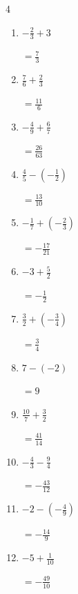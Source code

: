 \begin{multicols}{4}
\begin{enumerate}
        $\displaystyle =\frac{47}{20}$

  \item $\displaystyle -\frac{2}{3} + 3$

        $\displaystyle =\frac{7}{3}$

  \item $\displaystyle \frac{7}{6} + \frac{2}{3}$

        $\displaystyle =\frac{11}{6}$

\columnbreak %

  \item $\displaystyle -\frac{4}{9} + \frac{6}{7}$

        $\displaystyle =\frac{26}{63}$

  \item $\displaystyle \frac{4}{5} - \left(-\frac{1}{2}\right)$

        $\displaystyle =\frac{13}{10}$

  \item $\displaystyle -\frac{1}{7} + \left(-\frac{2}{3}\right)$

        $\displaystyle =-\frac{17}{21}$

  \item $\displaystyle -3 + \frac{5}{2}$

        $\displaystyle =-\frac{1}{2}$

  \item $\displaystyle \frac{3}{2} + \left(-\frac{3}{4}\right)$

        $\displaystyle =\frac{3}{4}$

  \item $\displaystyle 7 - \left(-2\right)$

        $\displaystyle =9$

  \item $\displaystyle \frac{10}{7} + \frac{3}{2}$

        $\displaystyle =\frac{41}{14}$

  \item $\displaystyle -\frac{4}{3} - \frac{9}{4}$

        $\displaystyle =-\frac{43}{12}$

  \item $\displaystyle -2 - \left(-\frac{4}{9}\right)$

        $\displaystyle =-\frac{14}{9}$

  \item $\displaystyle -5 + \frac{1}{10}$

        $\displaystyle =-\frac{49}{10}$


\end{enumerate}
\end{multicols}
